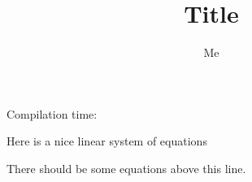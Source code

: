 \documentclass{simple-article}
\author{Me}
\title{Title}
\begin{document}
\maketitle
Compilation time: \DTMcurrenttime

Here is a nice linear system of equations


There should be some equations above this line.

\end{document}
